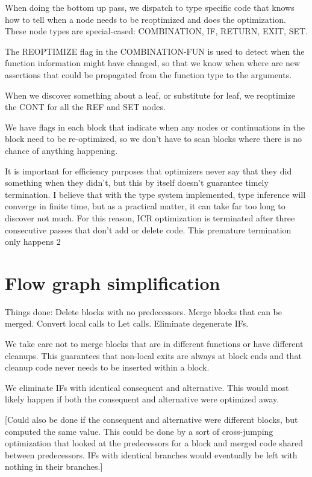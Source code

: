When doing the bottom up pass, we dispatch to type specific code that knows how
to tell when a node needs to be reoptimized and does the optimization.  These
node types are special-cased: COMBINATION, IF, RETURN, EXIT, SET.

The REOPTIMIZE flag in the COMBINATION-FUN is used to detect when the function
information might have changed, so that we know when where are new assertions
that could be propagated from the function type to the arguments.

When we discover something about a leaf, or substitute for leaf, we reoptimize
the CONT for all the REF and SET nodes. 

We have flags in each block that indicate when any nodes or continuations in
the block need to be re-optimized, so we don't have to scan blocks where there
is no chance of anything happening.

It is important for efficiency purposes that optimizers never say that they did
something when they didn't, but this by itself doesn't guarantee timely
termination.  I believe that with the type system implemented, type inference
will converge in finite time, but as a practical matter, it can take far too
long to discover not much.  For this reason, ICR optimization is terminated
after three consecutive passes that don't add or delete code.  This premature
termination only happens 2%


\section{Flow graph simplification}

Things done:
    Delete blocks with no predecessors.
    Merge blocks that can be merged.
    Convert local calls to Let calls.
    Eliminate degenerate IFs.

We take care not to merge blocks that are in different functions or have
different cleanups.  This guarantees that non-local exits are always at block
ends and that cleanup code never needs to be inserted within a block.

We eliminate IFs with identical consequent and alternative.  This would most
likely happen if both the consequent and alternative were optimized away.

[Could also be done if the consequent and alternative were different blocks,
but computed the same value.  This could be done by a sort of cross-jumping
optimization that looked at the predecessors for a block and merged code shared
between predecessors.  IFs with identical branches would eventually be left
with nothing in their branches.]

